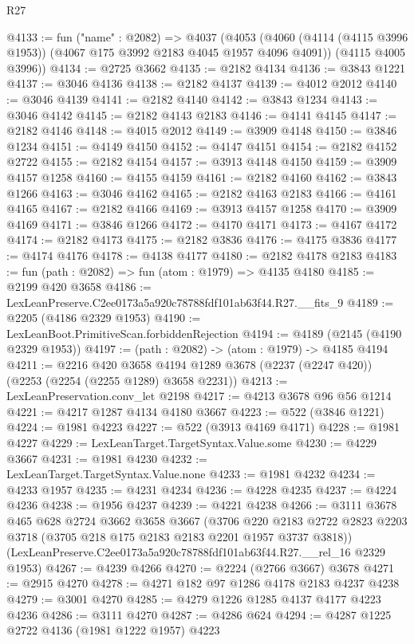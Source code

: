 \begin{lexlean}{R27}
\begin{coremodule}
@4133 := fun ("name" : @2082) =>
  @4037
    (@4053
      (@4060 (@4114 (@4115 @3996 @1953)) (@4067 @175 @3992 @2183 @4045 @1957 @4096 @4091))
      (@4115 @4005 @3996))
@4134 := @2725 @3662
@4135 := @2182 @4134
@4136 := @3843 @1221
@4137 := @3046 @4136
@4138 := @2182 @4137
@4139 := @4012 @2012
@4140 := @3046 @4139
@4141 := @2182 @4140
@4142 := @3843 @1234
@4143 := @3046 @4142
@4145 := @2182 @4143 @2183
@4146 := @4141 @4145
@4147 := @2182 @4146
@4148 := @4015 @2012
@4149 := @3909 @4148
@4150 := @3846 @1234
@4151 := @4149 @4150
@4152 := @4147 @4151
@4154 := @2182 @4152 @2722
@4155 := @2182 @4154
@4157 := @3913 @4148 @4150
@4159 := @3909 @4157 @1258
@4160 := @4155 @4159
@4161 := @2182 @4160
@4162 := @3843 @1266
@4163 := @3046 @4162
@4165 := @2182 @4163 @2183
@4166 := @4161 @4165
@4167 := @2182 @4166
@4169 := @3913 @4157 @1258
@4170 := @3909 @4169
@4171 := @3846 @1266
@4172 := @4170 @4171
@4173 := @4167 @4172
@4174 := @2182 @4173
@4175 := @2182 @3836
@4176 := @4175 @3836
@4177 := @4174 @4176
@4178 := @4138 @4177
@4180 := @2182 @4178 @2183
@4183 := fun (path : @2082) => fun (atom : @1979) => @4135 @4180
@4185 := @2199 @420 @3658
@4186 := LexLeanPreserve.C2ee0173a5a920c78788fdf101ab63f44.R27.__fits_9
@4189 := @2205 (@4186 @2329 @1953)
@4190 := LexLeanBoot.PrimitiveScan.forbiddenRejection
@4194 := @4189 (@2145 (@4190 @2329 @1953))
@4197 := (path : @2082) -> (atom : @1979) -> @4185 @4194
@4211 := @2216
    @420
    @3658
    @4194
    @1289
    @3678
    (@2237 (@2247 @420))
    (@2253 (@2254 (@2255 @1289) @3658 @2231))
@4213 := LexLeanPreservation.conv_let @2198
@4217 := @4213 @3678 @96 @56 @1214
@4221 := @4217 @1287 @4134 @4180 @3667
@4223 := @522 (@3846 @1221)
@4224 := @1981 @4223
@4227 := @522 (@3913 @4169 @4171)
@4228 := @1981 @4227
@4229 := LexLeanTarget.TargetSyntax.Value.some
@4230 := @4229 @3667
@4231 := @1981 @4230
@4232 := LexLeanTarget.TargetSyntax.Value.none
@4233 := @1981 @4232
@4234 := @4233 @1957
@4235 := @4231 @4234
@4236 := @4228 @4235
@4237 := @4224 @4236
@4238 := @1956 @4237
@4239 := @4221 @4238
@4266 := @3111
    @3678
    @465
    @628
    @2724
    @3662
    @3658
    @3667
    (@3706 @220 @2183 @2722 @2823 @2203 @3718 (@3705 @218 @175 @2183 @2183 @2201 @1957 @3737 @3818))
    (LexLeanPreserve.C2ee0173a5a920c78788fdf101ab63f44.R27.__rel_16 @2329 @1953)
@4267 := @4239 @4266
@4270 := @2224 (@2766 @3667) @3678
@4271 := @2915 @4270
@4278 := @4271 @182 @97 @1286 @4178 @2183 @4237 @4238
@4279 := @3001 @4270
@4285 := @4279 @1226 @1285 @4137 @4177 @4223 @4236
@4286 := @3111 @4270
@4287 := @4286 @624
@4294 := @4287 @1225 @2722 @4136 (@1981 @1222 @1957) @4223

\end{coremodule}
\end{lexlean}
